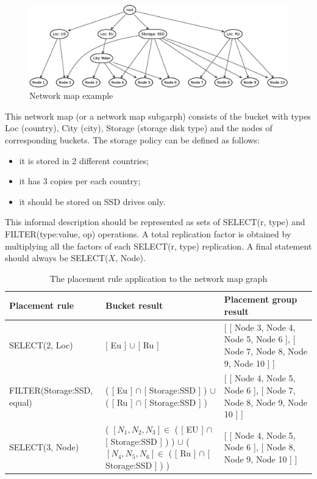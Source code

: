 \documentclass[a4paper, 11pt]{article}
\begin{document}
\begin{figure}[h]
\centering
\includegraphics[scale=.62]{pic/uml_8_n_map_0.eps}
\caption{Network map example}
\end{figure}

This network map (or a network map subgarph) consists of the bucket with types Loc
(country), City (city), Storage (storage disk type) and the nodes of
corresponding buckets. The storage policy can be defined as follows:

\begin{itemize}%
\item it is stored in 2 different countries;
\item it has 3 copies per each country;
\item it should be stored on SSD drives only.
\end{itemize}

This informal description should be represented as sets of SELECT(r, type) and
FILTER(type:value, op) operations. A total replication factor is obtained by
multiplying all the factors of each SELECT(r, type) replication. A final
statement should always be SELECT($ X $, Node).

\begin{table}[!h]

\begin{scriptsize}

\begin{tabular}{@{}|l|l|l|@{}}
\toprule
 Placement rule & Bucket result & Placement group result \\ \midrule

SELECT(2, Loc) & [ Eu ] $\cup$ [ Ru ] & \parbox{5.5cm}{[ [ Node 3, Node 4, Node 5, Node 6 ], [ Node 7, Node 8, Node 9, Node 10 ] ]}\\ \midrule

FILTER(Storage:SSD, equal) & \parbox{7cm}{( [ Eu ] $\cap$ [ Storage:SSD ] ) $\cup$  ( [ Ru ] $\cap$ [ Storage:SSD ] ) } & \parbox{5cm}{ [ [ Node 4, Node 5, Node 6 ], [ Node 7, Node 8, Node 9, Node 10 ] ]} \\ \midrule


SELECT(3, Node) & \parbox{7cm}{ ( $[N_1, N_2, N_3] \in $  ( [ EU ] $\cap$ [ Storage:SSD ] ) ) $\cup$  \\ (  $[N_4, N_5, N_6] \in $  ( [ Ru ] $\cap$ [ Storage:SSD ] ) ) } & \parbox{5 cm}{ [ [ Node 4, Node 5, Node 6 ], [ Node 8, Node 9, Node 10 ] ]} \\ \bottomrule

\end{tabular}
\end{scriptsize}

\caption{The placement rule application to the network map graph }
\end{table}
\end{document}
